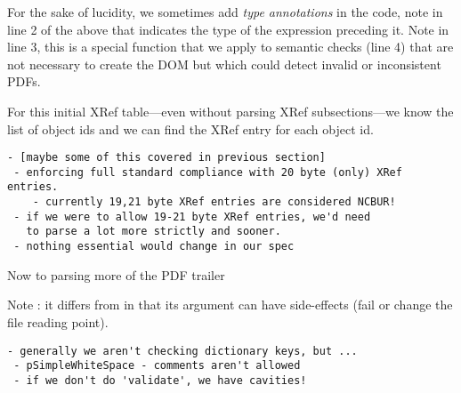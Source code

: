 For the sake of lucidity, we sometimes add \emph{type annotations} in
the code, note in line 2 of the above that 
indicates the type of the expression preceding it.
%
Note  in line 3, this is a special function that we apply to
semantic checks (line 4) that are not necessary to create the DOM but which
could detect invalid or inconsistent PDFs.

For this initial XRef table---even without parsing XRef subsections---we
know the list of object ids and we can find the XRef entry for each object id.

\begin{lstlisting}[style=meta]
 - [maybe some of this covered in previous section]
 - enforcing full standard compliance with 20 byte (only) XRef entries.
    - currently 19,21 byte XRef entries are considered NCBUR!
 - if we were to allow 19-21 byte XRef entries, we'd need
   to parse a lot more strictly and sooner.
 - nothing essential would change in our spec
\end{lstlisting}

  
Now to parsing more of the PDF trailer

Note : it differs from  in that
its argument can have side-effects (fail or change the file reading point).

\begin{lstlisting}[style=meta]
 - generally we aren't checking dictionary keys, but ...
 - pSimpleWhiteSpace - comments aren't allowed
 - if we don't do 'validate', we have cavities!
\end{lstlisting}


